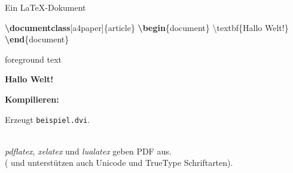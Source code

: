 \documentclass[aspectratio=169]{beamer}
\newenvironment{Shaded}{\begin{snugshade}}{\end{snugshade}}
\newcommand{\BuiltInTok}[1]{\textcolor[rgb]{0.25,0.67,0.19}{\textbf{#1}}}
\newcommand{\ExtensionTok}[1]{\textcolor[rgb]{0.25,0.67,0.19}{#1}}
\newcommand{\FunctionTok}[1]{\textcolor[rgb]{0.34,0.51,0.35}{#1}}
\newcommand{\KeywordTok}[1]{\textcolor[rgb]{0.25,0.67,0.19}{\textbf{#1}}}
\newcommand{\NormalTok}[1]{\textcolor[rgb]{0.19,0.19,0.19}{#1}}
\newenvironment{Shaded}{}{}
\newcommand\citestyle[1]{\textcolor{foreground-secondary}{\textsuperscript{#1}}}
\let\oldautocite\autocite
\renewcommand{\autocite}[1]{\citestyle{\oldautocite{#1}}}
\begin{document}
    \begin{frame}[fragile]{Ein \LaTeX-Dokument}
    \protect\hypertarget{ein--dokument}{}
    \begin{minipage}{0.66\textwidth}

\begin{Shaded}
\begin{Highlighting}[]
\BuiltInTok{\textbackslash{}documentclass}\NormalTok{[a4paper]\{}\ExtensionTok{article}\NormalTok{\}}
\KeywordTok{\textbackslash{}begin}\NormalTok{\{}\ExtensionTok{document}\NormalTok{\}}
    \FunctionTok{\textbackslash{}textbf}\NormalTok{\{Hallo Welt!\}}
\KeywordTok{\textbackslash{}end}\NormalTok{\{}\ExtensionTok{document}\NormalTok{\}}
\end{Highlighting}
\end{Shaded}

    \end{minipage}\begin{minipage}{0.33\textwidth}

    \bgroup 
        \begin{OutputBox}
        \begin{beamercolorbox}{foreground text}
            \selectfont%

        \textbf{Hallo Welt!}

            \end{beamercolorbox}
        \end{OutputBox}
    \egroup

    \end{minipage}

    \vspace{0.5\baselineskip}

    \textbf{Kompilieren:}

\begin{Shaded}
\end{Shaded}

    Erzeugt \texttt{beispiel.dvi}.\\
    \strut \\
    \emph{pdflatex}\autocite{ctan-pdftex},
    \emph{xelatex}\autocite{ctan-xetex} und
    \emph{lualatex}\autocite{ctan-luatex} geben PDF aus.\\
    ( und  unterstützen auch Unicode und
    TrueType Schriftarten).
    \end{frame}
\end{document}
